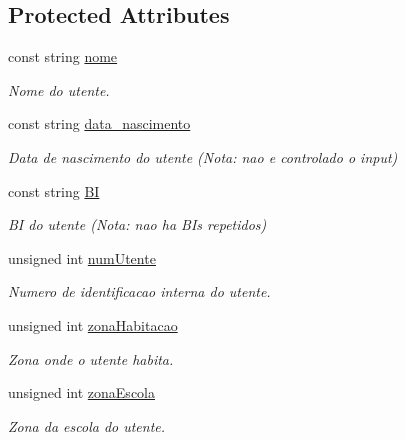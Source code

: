 \subsection*{Protected Attributes}
\begin{DoxyCompactItemize}
\item 
\mbox{\label{class_utente_a328c722d27759eaa88596ccb4cf2549f}} 
const string \mbox{\hyperlink{class_utente_a328c722d27759eaa88596ccb4cf2549f}{nome}}
\begin{DoxyCompactList}\small\item\em Nome do utente. \end{DoxyCompactList}\item 
\mbox{\label{class_utente_a04d2aeac0b14725caa1066a1c34806f1}} 
const string \mbox{\hyperlink{class_utente_a04d2aeac0b14725caa1066a1c34806f1}{data\+\_\+nascimento}}
\begin{DoxyCompactList}\small\item\em Data de nascimento do utente (Nota\+: nao e controlado o input) \end{DoxyCompactList}\item 
\mbox{\label{class_utente_ac5acf8e42ccd10808d077fc0db2e05f9}} 
const string \mbox{\hyperlink{class_utente_ac5acf8e42ccd10808d077fc0db2e05f9}{BI}}
\begin{DoxyCompactList}\small\item\em BI do utente (Nota\+: nao ha BI\textquotesingle{}s repetidos) \end{DoxyCompactList}\item 
\mbox{\label{class_utente_ac1bde470c6fa7d57665c6d7fa24c90f2}} 
unsigned int \mbox{\hyperlink{class_utente_ac1bde470c6fa7d57665c6d7fa24c90f2}{num\+Utente}}
\begin{DoxyCompactList}\small\item\em Numero de identificacao interna do utente. \end{DoxyCompactList}\item 
\mbox{\label{class_utente_a424e352516988e1ad851c7433a512463}} 
unsigned int \mbox{\hyperlink{class_utente_a424e352516988e1ad851c7433a512463}{zona\+Habitacao}}
\begin{DoxyCompactList}\small\item\em Zona onde o utente habita. \end{DoxyCompactList}\item 
\mbox{\label{class_utente_a435d662e6cfc7f767e3d7afbba97a530}} 
unsigned int \mbox{\hyperlink{class_utente_a435d662e6cfc7f767e3d7afbba97a530}{zona\+Escola}}
\begin{DoxyCompactList}\small\item\em Zona da escola do utente. \end{DoxyCompactList}\end{DoxyCompactItemize}
